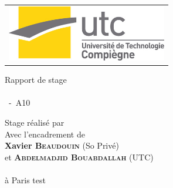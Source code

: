 \begin{titlepage}
 \begin{multicols}{2}
  \begin{flushleft}
   \begin{tabular}[l]{lrl}
    \multicolumn{3}{c}{
     \includegraphics[width=7cm]{img/logo_utc}
    } \\
   \end{tabular}
  \end{flushleft}

 \end{multicols}

 \begin{center}
  \vspace{120pt} 
  \LARGE
	Rapport de stage \uvname \\
  \vspace{20pt}
  \Huge
   \textbf{\subjectname} \\
  \vspace{20pt}
  \Large
   \authorname ~-~A10
 \end{center}

 \vspace{160pt}
 \begin{flushright}
  \normalsize
	Stage réalisé par \textbf{\authorname} \\
	Avec l'encadrement de \\
	\textbf{Xavier \textsc{Beaudouin}} (So Privé)\\
	et \textbf{\textsc{Abdelmadjid Bouabdallah}} (UTC) \\
	\thedate \\
	à Paris
	test\cite{rfc_3442}
 \end{flushright}
\end{titlepage}


\setcounter{page}{0}
\thispagestyle{empty}
\mbox{}
\newpage

